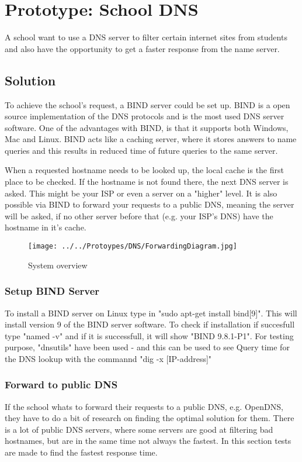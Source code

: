 \documentclass[Preamble]{subfiles}
\begin{document}
\chapter{Prototype: School DNS}
A school want to use a DNS server to filter certain internet sites from students and also have the opportunity to get a faster response from the name server. 

\section{Solution}
To achieve the school's request, a BIND server could be set up. BIND is a open source implementation of the DNS protocols and is the most used DNS server software. One of the advantages with BIND, is that it supports both Windows, Mac and Linux. BIND acts like a caching server, where it stores answers to name queries and this results in reduced time of future queries to the same server.

When a requested hostname needs to be looked up, the local cache is the first place to be checked. If the hostname is not found there, the next DNS server is asked. This might be your ISP or even a server on a "higher" level. It is also possible via BIND to forward your requests to a public DNS, meaning the server will be asked, if no other server before that (e.g. your ISP's DNS) have the hostname in it's cache. 

\begin{figure}[hbtp]
\centering
\texttt{[image: ../../Protoypes/DNS/ForwardingDiagram.jpg]}
\caption{System overview}
\end{figure}


\subsection{Setup BIND Server}
To install a BIND server on Linux type in "sudo apt-get install bind[9]". This will install version 9 of the BIND server software. To check if installation if succesfull type "named -v" and if it is successfull, it will show "BIND 9.8.1-P1". For testing purpose, "dnsutils" have been used - and this can be used to see Query time for the DNS lookup with the commannd "dig -x [IP-address]"

\subsection{Forward to public DNS}
If the school whats to forward their requests to a public DNS, e.g. OpenDNS, they have to do a bit of research on finding the optimal solution for them. There is a lot of public DNS servers, where some servers are good at filtering bad hostnames, but are in the same time not always the fastest. In this section tests are made to find the fastest response time.
\end{document}

